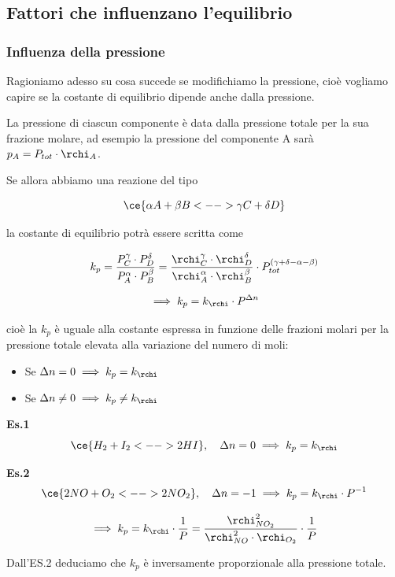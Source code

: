 \subsection{Fattori che influenzano l'equilibrio}

\subsubsection{Influenza della pressione}
Ragioniamo adesso su cosa succede se modifichiamo la pressione, cioè vogliamo capire se la costante di equilibrio dipende anche dalla pressione.

La pressione di ciascun componente è data dalla pressione totale per la sua frazione molare, ad esempio la pressione del componente A sarà $p_A = P_{tot} \cdot \rchi_A$.

Se allora abbiamo una reazione del tipo

$$\ce{\alpha A + \beta B <--> \gamma C + \delta D}$$

la costante di equilibrio potrà essere scritta come

$$k_p = \frac{P_C^{\gamma} \cdot P_D^{\delta}}{P_A^{\alpha} \cdot P_B^{\beta}} = \frac{\rchi_C^{\gamma} \cdot \rchi_D^{\delta}}{\rchi_A^{\alpha} \cdot \rchi_B^{\beta}} \cdot P_{tot}^{(\gamma + \delta - \alpha - \beta)}$$

$$\implies k_p = k_{\rchi} \cdot P^{\Delta n}$$

cioè la $k_p$ è uguale alla costante espressa in funzione delle frazioni molari per la pressione totale elevata alla variazione del numero di moli:

\begin{itemize}
    \item Se $\Delta n = 0 \implies k_p = k_{\rchi}$
    \item Se $\Delta n \neq 0 \implies k_p \neq k_{\rchi}$
\end{itemize}

\vspace{0.2cm}\textbf{Es.1}
$$\ce{H_2 + I_2 <--> 2HI}, \quad \Delta n = 0 \implies k_p = k_{\rchi}$$

\textbf{Es.2}
$$\ce{2NO + O_2 <--> 2NO_2}, \quad \Delta n = -1 \implies k_p = k_{\rchi} \cdot P^{-1}$$

$$\implies k_p = k_{\rchi} \cdot \frac{1}{P}= \frac{\rchi_{NO_2}^2}{\rchi_{NO}^2 \cdot \rchi_{O_2}} \cdot \frac{1}{P}$$

Dall'ES.2 deduciamo che $k_p$ è inversamente proporzionale alla pressione totale.

